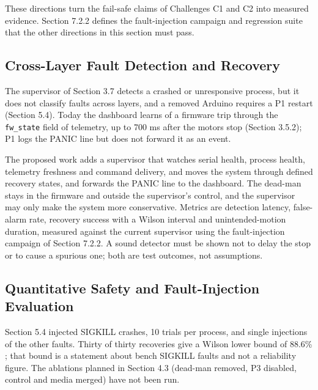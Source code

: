 These directions turn the fail-safe claims of Challenges C1 and C2 into measured evidence. Section 7.2.2 defines the fault-injection campaign and regression suite that the other directions in this section must pass.

\subsection{Cross-Layer Fault Detection and Recovery}

The supervisor of Section 3.7 detects a crashed or unresponsive process, but it does not classify faults across layers, and a removed Arduino requires a P1 restart (Section 5.4). Today the dashboard learns of a firmware trip through the \texttt{fw\_state} field of telemetry, up to 700 ms after the motors stop (Section 3.5.2); P1 logs the PANIC line but does not forward it as an event.

The proposed work adds a supervisor that watches serial health, process health, telemetry freshness and command delivery, and moves the system through defined recovery states, and forwards the PANIC line to the dashboard. The dead-man stays in the firmware and outside the supervisor's control, and the supervisor may only make the system more conservative. Metrics are detection latency, false-alarm rate, recovery success with a Wilson interval \cite{wilson1927} and unintended-motion duration, measured against the current supervisor using the fault-injection campaign of Section 7.2.2. A sound detector must be shown not to delay the stop or to cause a spurious one; both are test outcomes, not assumptions.

\subsection{Quantitative Safety and Fault-Injection Evaluation}

Section 5.4 injected SIGKILL crashes, 10 trials per process, and single injections of the other faults. Thirty of thirty recoveries give a Wilson lower bound of 88.6\% \cite{wilson1927}; that bound is a statement about bench SIGKILL faults and not a reliability figure. The ablations planned in Section 4.3 (dead-man removed, P3 disabled, control and media merged) have not been run.


